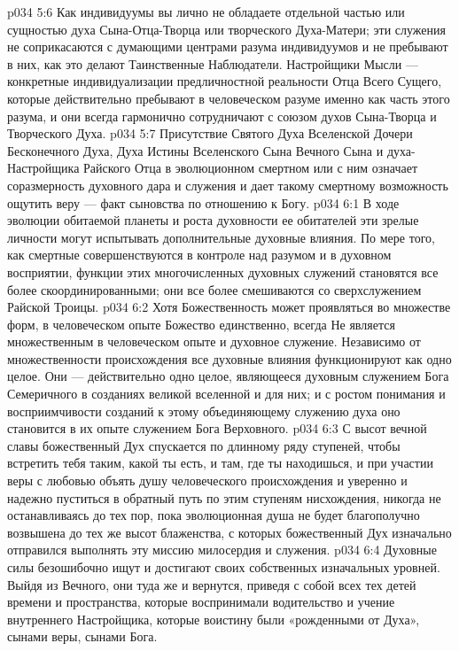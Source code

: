 \vs p034 5:6 \pc Как индивидуумы вы лично не обладаете отдельной частью или сущностью духа Сына\hyp{}Отца\hyp{}Творца или творческого Духа\hyp{}Матери; эти служения не соприкасаются с думающими центрами разума индивидуумов и не пребывают в них, как это делают Таинственные Наблюдатели. Настройщики Мысли --- конкретные индивидуализации предличностной реальности Отца Всего Сущего, которые действительно пребывают в человеческом разуме именно как часть этого разума, и они всегда гармонично сотрудничают с союзом духов Сына\hyp{}Творца и Творческого Духа.
\vs p034 5:7 Присутствие Святого Духа Вселенской Дочери Бесконечного Духа, Духа Истины Вселенского Сына Вечного Сына и духа\hyp{}Настройщика Райского Отца в эволюционном смертном или с ним означает соразмерность духовного дара и служения и дает такому смертному возможность ощутить веру --- факт сыновства по отношению к Богу.
\vs p034 6:1 В ходе эволюции обитаемой планеты и роста духовности ее обитателей эти зрелые личности могут испытывать дополнительные духовные влияния. По мере того, как смертные совершенствуются в контроле над разумом и в духовном восприятии, функции этих многочисленных духовных служений становятся все более скоординированными; они все более смешиваются со сверхслужением Райской Троицы.
\vs p034 6:2 Хотя Божественность может проявляться во множестве форм, в человеческом опыте Божество единственно, всегда  Не является множественным в человеческом опыте и духовное служение. Независимо от множественности происхождения все духовные влияния функционируют как одно целое. Они --- действительно одно целое, являющееся духовным служением Бога Семеричного в созданиях великой вселенной и для них; и с ростом понимания и восприимчивости созданий к этому объединяющему служению духа оно становится в их опыте служением Бога Верховного.
\vs p034 6:3 \pc С высот вечной славы божественный Дух спускается по длинному ряду ступеней, чтобы встретить тебя таким, какой ты есть, и там, где ты находишься, и при участии веры с любовью объять душу человеческого происхождения и уверенно и надежно пуститься в обратный путь по этим ступеням нисхождения, никогда не останавливаясь до тех пор, пока эволюционная душа не будет благополучно возвышена до тех же высот блаженства, с которых божественный Дух изначально отправился выполнять эту миссию милосердия и служения.
\vs p034 6:4 Духовные силы безошибочно ищут и достигают своих собственных изначальных уровней. Выйдя из Вечного, они туда же и вернутся, приведя с собой всех тех детей времени и пространства, которые воспринимали водительство и учение внутреннего Настройщика, которые воистину были «рожденными от Духа», сынами веры, сынами Бога.
